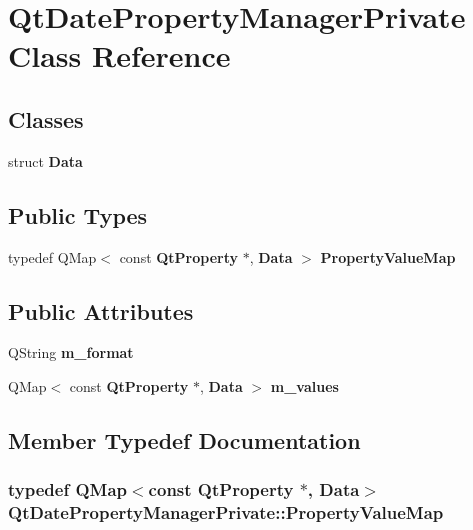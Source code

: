 \section{Qt\+Date\+Property\+Manager\+Private Class Reference}
\label{classQtDatePropertyManagerPrivate}
\subsection*{Classes}
\begin{DoxyCompactItemize}
\item 
struct {\bf Data}
\end{DoxyCompactItemize}
\subsection*{Public Types}
\begin{DoxyCompactItemize}
\item 
typedef Q\+Map$<$ const {\bf Qt\+Property} $\ast$, {\bf Data} $>$ {\bf Property\+Value\+Map}
\end{DoxyCompactItemize}
\subsection*{Public Attributes}
\begin{DoxyCompactItemize}
\item 
Q\+String {\bf m\+\_\+format}
\item 
Q\+Map$<$ const {\bf Qt\+Property} $\ast$, {\bf Data} $>$ {\bf m\+\_\+values}
\end{DoxyCompactItemize}


\subsection{Member Typedef Documentation}
\subsubsection[{Property\+Value\+Map}]{\setlength{\rightskip}{0pt plus 5cm}typedef Q\+Map$<$const {\bf Qt\+Property} $\ast$, {\bf Data}$>$ {\bf Qt\+Date\+Property\+Manager\+Private\+::\+Property\+Value\+Map}}\label{classQtDatePropertyManagerPrivate_a156519a2416cb7a1cbd182b1eb1b4451}


